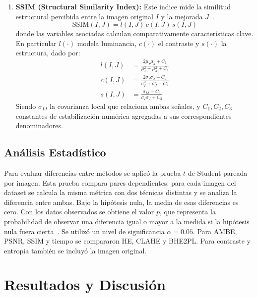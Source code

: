 \documentclass[journal,10pt,twocolumn]{IEEEtran}
\begin{document}
\begin{enumerate}
	\begin{equation}
		\sigma(J)=\sqrt{\sum_{k=0}^{L-1}(k-\mu(J))^2 \cdot p(k)}
	\end{equation}
	El valor de contraste de la imagen resultante debe ser superior al contraste de la imagen de entrada para asumir una mejora.
	\item \textbf{SSIM (Structural Similarity Index):} Este índice mide la similitud estructural percibida entre la imagen original $I$ y la mejorada $J$~\cite{hore2010image}.
	\begin{equation}
		\mathrm{SSIM}(I,J)=l(I,J)\,c(I,J)\,s(I,J)
	\end{equation}
	donde las variables asociadas calculan comparativamente características clave. En particular $l(\cdot)$ modela luminancia, $c(\cdot)$ el contraste y $s(\cdot)$ la estructura, dado por:
	\begin{align}
		l(I,J) &= \frac{2\mu_I\mu_J + C_1}{\mu_I^2+\mu_J^2+C_1} \\
		c(I,J) &= \frac{2\sigma_I\sigma_J + C_2}{\sigma_I^2+\sigma_J^2+C_2} \\
		s(I,J) &= \frac{\sigma_{IJ}+C_3}{\sigma_I\sigma_J+C_3}
	\end{align}
	Siendo $\sigma_{IJ}$ la covarianza local que relaciona ambas señales, y $C_1,C_2,C_3$ constantes de estabilización numérica agregadas a sus correspondientes denominadores.
\end{enumerate}

\subsection{Análisis Estadístico}
Para evaluar diferencias entre métodos se aplicó la prueba $t$ de Student pareada por imagen. Esta prueba compara pares dependientes: para cada imagen del dataset se calcula la misma métrica con dos técnicas distintas y se analiza la diferencia entre ambas. Bajo la hipótesis nula, la media de esas diferencias es cero. Con los datos observados se obtiene el valor $p$, que representa la probabilidad de observar una diferencia igual o mayor a la medida si la hipótesis nula fuera cierta~\cite{ho2019moving}. Se utilizó un nivel de significancia $\alpha=0.05$. Para AMBE, PSNR, SSIM y tiempo se compararon HE, CLAHE y BHE2PL. Para contraste y entropía también se incluyó la imagen original.

\section{Resultados y Discusión}
\end{document}
